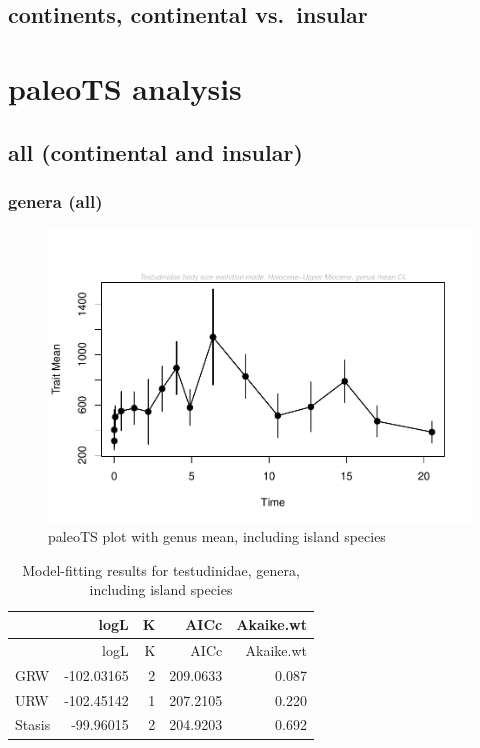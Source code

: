 \documentclass[]{article}
\begin{document}
\subsection{continents, continental
vs.~insular}\label{continents-continental-vs.insular}

\newpage

\section{paleoTS analysis}\label{paleots-analysis}

\subsection{all (continental and
insular)}\label{all-continental-and-insular}

\subsubsection{genera (all)}\label{genera-all}

\begin{figure}[htbp]
\centering
\includegraphics{MA_JJ_files/figure-latex/paleoTS plot with genus mean, including island species-1.pdf}
\caption{paleoTS plot with genus mean, including island species}
\end{figure}

\begin{longtable}[]{@{}lrrrr@{}}
\caption{Model-fitting results for testudinidae, genera, including
island species}\tabularnewline
\toprule
& logL & K & AICc & Akaike.wt\tabularnewline
\midrule
\endfirsthead
\toprule
& logL & K & AICc & Akaike.wt\tabularnewline
\midrule
\endhead
GRW & -102.03165 & 2 & 209.0633 & 0.087\tabularnewline
URW & -102.45142 & 1 & 207.2105 & 0.220\tabularnewline
Stasis & -99.96015 & 2 & 204.9203 & 0.692\tabularnewline
\bottomrule
\end{longtable}
\end{document}
